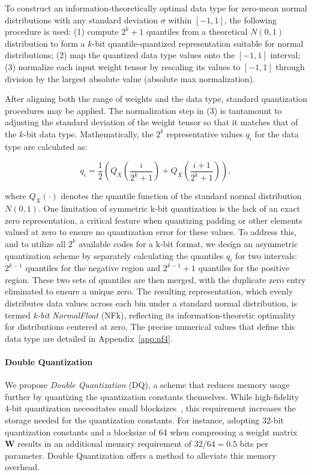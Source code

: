 To construct an information-theoretically optimal data type for zero-mean normal distributions with any standard deviation $\sigma$ within $[-1, 1]$, the following procedure is used: (1) compute $2^k+1$ quantiles from a theoretical $N(0,1)$ distribution to form a $k$-bit quantile-quantized representation suitable for normal distributions; (2) map the quantized data type values onto the $[-1, 1]$ interval; (3) normalize each input weight tensor by rescaling its values to $[-1, 1]$ through division by the largest absolute value (absolute max normalization).

After aligning both the range of weights and the data type, standard quantization procedures may be applied. The normalization step in (3) is tantamount to adjusting the standard deviation of the weight tensor so that it matches that of the $k$-bit data type. Mathematically, the $2^k$ representative values $q_i$ for the data type are calculated as:

\begin{equation}
q_i  = \frac{1}{2}\left( Q_X\left(\frac{i}{2^k+1}\right) + Q_X\left(\frac{i+1}{2^k+1}\right)\right),
\end{equation}

where $Q_X(\cdot)$ denotes the quantile function of the standard normal distribution $N(0,1)$. One limitation of symmetric k-bit quantization is the lack of an exact zero representation, a critical feature when quantizing padding or other elements valued at zero to ensure no quantization error for these values. To address this, and to utilize all $2^k$ available codes for a k-bit format, we design an asymmetric quantization scheme by separately calculating the quantiles $q_i$ for two intervals: $2^{k-1}$ quantiles for the negative region and $2^{k-1}+1$ quantiles for the positive region. These two sets of quantiles are then merged, with the duplicate zero entry eliminated to ensure a unique zero. The resulting representation, which evenly distributes data values across each bin under a standard normal distribution, is termed \emph{k-bit NormalFloat} (NFk), reflecting its information-theoretic optimality for distributions centered at zero. The precise numerical values that define this data type are detailed in Appendix~\ref{app:nf4}.

\paragraph{Double Quantization{}} 
We propose \emph{Double Quantization} (DQ), a scheme that reduces memory usage further by quantizing the quantization constants themselves. While high-fidelity 4-bit quantization necessitates small blocksizes~\citep{dettmers2022case}, this requirement increases the storage needed for the quantization constants. For instance, adopting 32-bit quantization constants and a blocksize of 64 when compressing a weight matrix $\mathbf{W}$ results in an additional memory requirement of $32/64 = 0.5$ bits per parameter. Double Quantization offers a method to alleviate this memory overhead.

